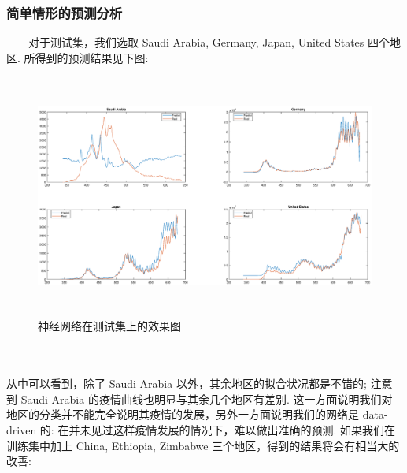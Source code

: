 \documentclass[a4paper, titlepage]{article}
\begin{document}
        \subsubsection{简单情形的预测分析}
	　　对于测试集，我们选取 Saudi Arabia, Germany, Japan, United States 四个地区. 所得到的预测结果见下图:\\
	\begin{minipage}{\textwidth}
        \begin{figure}[H]
            \centering
            \includegraphics[height=8cm, width=14cm]{./images/Chapter5/Pred2.eps}
            \vspace{-1.5em}
            \caption{神经网络在测试集上的效果图}
        \end{figure}
    \end{minipage}\\\quad\\
	从中可以看到，除了 Saudi Arabia 以外，其余地区的拟合状况都是不错的; 注意到 Saudi Arabia 的疫情曲线也明显与其余几个地区有差别. 这一方面说明我们对地区的分类并不能完全说明其疫情的发展，另外一方面说明我们的网络是 data-driven 的: 在并未见过这样疫情发展的情况下，难以做出准确的预测. 如果我们在训练集中加上 China, Ethiopia, Zimbabwe 三个地区，得到的结果将会有相当大的改善:\\
    \vspace{-1em}
\end{document}
